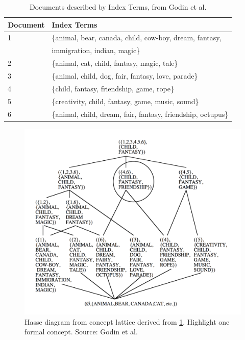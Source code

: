 \documentclass[11pt]{report}
\begin{document}
\begin{table}[h]
\caption{Documents described by Index Terms, from Godin et al. \cite{Godin1993}}
\label{table:fcair}
\centering

\def\arraystretch{1.2}%
\begin{tabular}{ | l | l | }
\hline
 Document & Index Terms \\
\hline

1 & \{animal, bear, canada, child, cow-boy, dream, fantasy,\\
  & immigration, indian, magic\} \\
2 & \{animal, cat, child, fantasy, magic, tale\} \\
3 & \{animal, child, dog, fair, fantasy, love, parade\} \\
4 & \{child, fantasy, friendship, game, rope\} \\
5 & \{creativity, child, fantasy, game, music, sound\} \\
6 & \{animal, child, dream, fair, fantasy, friendship, octupus\} \\

\hline
\end{tabular}
\end{table}

\begin{figure}[!ht]
	\centering
	\includegraphics[width=\linewidth]{./images/fcair}
\caption{Hasse diagram from concept lattice derived from \ref{table:fcair}. Highlight one formal concept. Source: Godin et al. \cite{Godin1993}}
\label{figure:fcair}
\end{figure}
\end{document}
